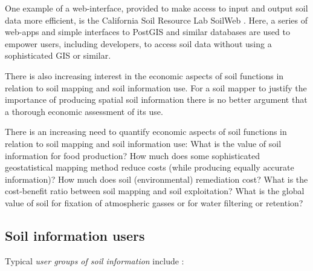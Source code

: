 \documentclass[graybox,natbib,nospthms,UStrade]{svmono}
\let\BeginKnitrBlock\begin \let\EndKnitrBlock\end
\let\BeginKnitrBlock\begin \let\EndKnitrBlock\end
\begin{document}
One example of a web-interface, provided to make access to input and output
soil data more efficient, is the California Soil Resource Lab SoilWeb \citep{OGeen2017soilweb}.
Here, a series of web-apps and simple interfaces to PostGIS and similar databases
are used to empower users, including developers, to access soil data without
using a sophisticated GIS or similar.

There is also increasing interest in the economic aspects of soil
functions in relation to soil mapping and soil information use. For a
soil mapper to justify the importance of producing spatial soil
information there is no better argument that a thorough economic
assessment of its use.

\BeginKnitrBlock{rmdnote}
There is an increasing need to quantify
economic aspects of soil functions in relation to soil mapping and soil
information use: What is the value of soil information for food
production? How much does some sophisticated geostatistical mapping
method reduce costs (while producing equally accurate information)? How
much does soil (environmental) remediation cost? What is the
cost-benefit ratio between soil mapping and soil exploitation? What is
the global value of soil for fixation of atmospheric gasses or for water filtering or retention?
\EndKnitrBlock{rmdnote}

\hypertarget{soil-information-users}{%
\subsection{Soil information users}\label{soil-information-users}}

Typical \emph{user groups of soil information} include
\citep{SSDS1993, harpstead2001soil}:
\end{document}
